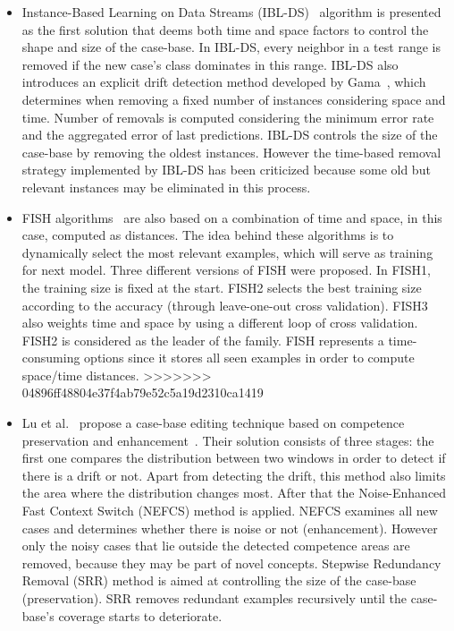 \documentclass[preprint,12pt]{elsarticle}
\begin{document}
\begin{itemize}
\begin{itemize}
	\item Instance-Based Learning on Data Streams (IBL-DS)~\cite{berin07} algorithm is presented as the first solution that deems both time and space factors to control the shape and size of the case-base. In IBL-DS, every neighbor in a test range is removed if the new case's class dominates in this range. IBL-DS also introduces an explicit drift detection method developed by Gama~\cite{gama04}, which determines when removing a fixed number of instances considering space and time. Number of removals is computed considering the minimum error rate and the aggregated error of last predictions. IBL-DS controls the size of the case-base by removing the oldest instances. However the time-based removal strategy implemented by IBL-DS has been criticized because some old but relevant instances may be eliminated in this process.
	\item FISH algorithms~\cite{zlio11} are also based on a combination of time and space, in this case, computed as distances. The idea behind these algorithms is to dynamically select the most relevant examples, which will serve as training for next model. Three different versions of FISH were proposed. In FISH1, the training size is fixed at the start. FISH2 selects the best training size according to the accuracy (through leave-one-out cross validation). FISH3 also weights time and space by using a different loop of cross validation. FISH2 is considered as the leader of the family. FISH represents a time-consuming options since it stores all seen examples in order to compute space/time distances.
>>>>>>> 04896ff48804e37f4ab79e52c5a19d2310ca1419
	\item Lu et al.~\cite{lu16} propose a case-base editing technique based on competence preservation and enhancement~\cite{smyth95}. Their solution consists of three stages: the first one compares the distribution between two windows in order to detect if there is a drift or not. Apart from detecting the drift, this method also limits the area where the distribution changes most. After that the Noise-Enhanced Fast Context Switch (NEFCS) method is applied. NEFCS examines all new cases and determines whether there is noise or not (enhancement). However only the noisy cases that lie outside the detected competence areas are removed, because they may be part of novel concepts. Stepwise Redundancy Removal (SRR) method is aimed at controlling the size of the case-base (preservation). SRR removes redundant examples recursively until the case-base's coverage starts to deteriorate.


\end{itemize}
\end{itemize}
\end{document}

